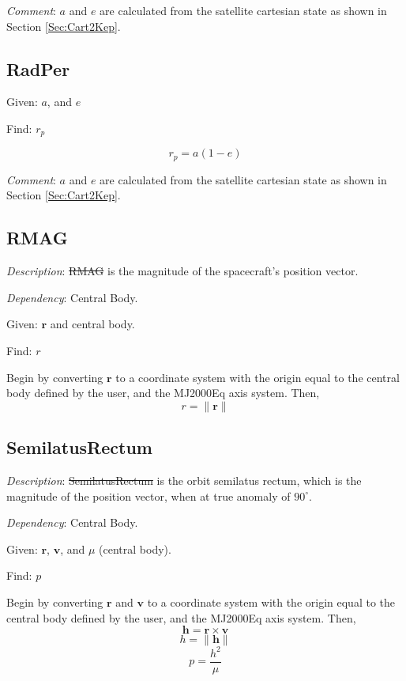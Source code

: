 \noindent \textit{Comment}:  $a$ and $e$ are calculated from the
satellite cartesian state as shown in Section \ref{Sec:Cart2Kep}.

\subsection{RadPer}

Given:  $a$, and $e$

\noindent Find:  $r_p$

\begin{equation}
    r_p = a(1-e)
\end{equation}

\noindent \textit{Comment}:  $a$ and $e$ are calculated from the
satellite cartesian state as shown in Section \ref{Sec:Cart2Kep}.

\subsection{RMAG} 

\noindent \textit{Description}: \st{RMAG} is the magnitude of the
spacecraft's position vector.

\noindent \textit{Dependency}:  Central Body.

\noindent Given:  $\mathbf{r}$ and central body.

\noindent Find:  $r$

Begin by converting $\mathbf{r}$  to a coordinate system with the
origin equal to the central body defined by the user, and the
MJ2000Eq axis system.  Then,
%
\begin{equation}
    r = \| \mathbf{r} \|
\end{equation}

\subsection{SemilatusRectum} 

\noindent \textit{Description}: \st{SemilatusRectum} is the orbit
semilatus rectum, which is the magnitude of the position vector,
when at true anomaly of $90^{\circ}$.

\noindent \textit{Dependency}:  Central Body.

\noindent Given:  $\mathbf{r}$, $\mathbf{v}$, and $\mu$ (central
body).

\noindent Find:  $p$

Begin by converting $\mathbf{r}$ and $\mathbf{v}$ to a coordinate
system with the origin equal to the central body defined by the
user, and the MJ2000Eq axis system.  Then,
%
\begin{equation}
    \mathbf{h} = \mathbf{r} \times \mathbf{v}
\end{equation}
%
\begin{equation}
    h = \| \mathbf{h} \|
\end{equation}
%
\begin{equation}
    p = \frac{h^2}{\mu}
\end{equation}


